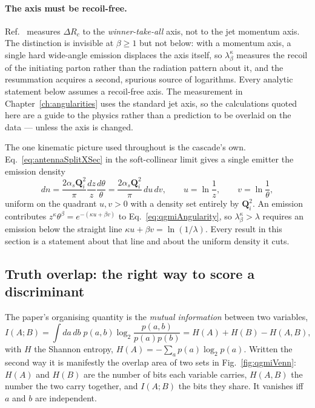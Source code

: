 \paragraph{The axis must be recoil-free.} Ref.~\cite{Larkoski_2014} measures
\(\Delta R_c\) to the \emph{winner-take-all} axis, not to the jet momentum axis.
The distinction is invisible at \(\beta\ge1\) but not below: with a momentum axis, a
single hard wide-angle emission displaces the axis itself, so \(\lambda^\kappa_\beta\)
measures the recoil of the initiating parton rather than the radiation pattern about
it, and the resummation acquires a second, spurious source of logarithms. Every
analytic statement below assumes a recoil-free axis. The measurement in
Chapter~\ref{ch:angularities} uses the standard jet axis, so the calculations quoted
here are a guide to the physics rather than a prediction to be overlaid on the data
--- unless the axis is changed.

The one kinematic picture used throughout is the cascade's own. Eq.~\ref{eq:antennaSplitXSec}
in the soft-collinear limit gives a single emitter the emission density
\begin{equation}
	dn = \frac{2\alpha_s\mathbf{Q}_i^2}{\pi}\frac{dz}{z}\frac{d\theta}{\theta}
	= \frac{2\alpha_s\mathbf{Q}_i^2}{\pi}\,du\,dv ,
	\qquad
	u = \ln\frac{1}{z} ,
	\qquad
	v = \ln\frac{1}{\theta} ,
	\label{eq:qgmiLundPlane}
\end{equation}
uniform on the quadrant \(u,v>0\) with a density set entirely by \(\mathbf{Q}_i^2\).
An emission contributes \(z^\kappa\theta^\beta = e^{-(\kappa u+\beta v)}\) to
Eq.~\ref{eq:qgmiAngularity}, so \(\lambda^\kappa_\beta>\lambda\) requires an emission
below the straight line \(\kappa u+\beta v=\ln(1/\lambda)\). Every result in this
section is a statement about that line and about the uniform density it cuts.

\subsection{Truth overlap: the right way to score a discriminant}
\label{subsec:qgmiMI}

The paper's organising quantity is the \emph{mutual information} between two
variables,
\begin{equation}
	I(A;B) = \int da\,db\;p(a,b)\log_2\frac{p(a,b)}{p(a)p(b)}
	= H(A)+H(B)-H(A,B) ,
	\label{eq:qgmiMIdef}
\end{equation}
with \(H\) the Shannon entropy, \(H(A)=-\sum_a p(a)\log_2p(a)\). Written the second
way it is manifestly the overlap area of two sets in Fig.~\ref{fig:qgmiVenn}:
\(H(A)\) and \(H(B)\) are the number of bits each variable carries, \(H(A,B)\) the
number the two carry together, and \(I(A;B)\) the bits they share. It vanishes iff
\(a\) and \(b\) are independent.

